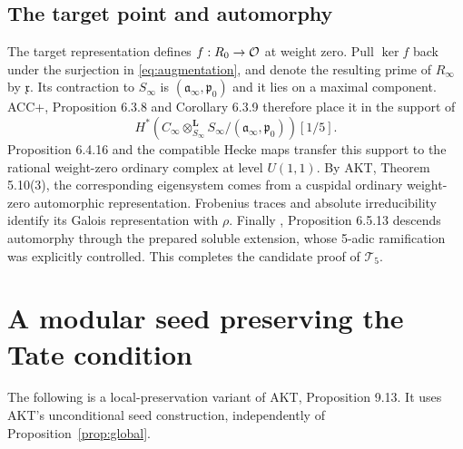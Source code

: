 \documentclass[11pt,a4paper]{article}
\theoremstyle{definition}\newtheorem{definition}[theorem]{Definition}
\theoremstyle{remark}\newtheorem*{remark}{Remark}
\newcommand{\Tinput}{\mathcal T_5}
\begin{document}
\subsection{The target point and automorphy}

The target representation defines $f:R_0\to\mathcal O$ at weight zero. Pull
$\ker f$ back under the surjection in \eqref{eq:augmentation}, and denote
the resulting prime of $R_\infty$ by $\mathfrak x$. Its contraction to
$S_\infty$ is $(\mathfrak a_\infty,\mathfrak p_0)$ and it lies on a maximal
component. ACC+, Proposition 6.3.8 and Corollary 6.3.9 therefore place it in
the support of
\[
H^*\!\left(C_\infty\otimes^{\mathbf L}_{S_\infty}
S_\infty/(\mathfrak a_\infty,\mathfrak p_0)\right)[1/5].
\]
Proposition 6.4.16 and the compatible Hecke maps transfer this support to
the rational weight-zero ordinary complex at level $U(1,1)$. By AKT,
Theorem 5.10(3), the corresponding eigensystem comes from a cuspidal ordinary
weight-zero automorphic representation. Frobenius traces and absolute
irreducibility identify its Galois representation with $\rho$.
Finally \cite{ACC}, Proposition 6.5.13 descends automorphy through the
prepared soluble extension, whose 5-adic ramification was explicitly
controlled. This completes the candidate proof of $\Tinput$.

\section{A modular seed preserving the Tate condition}
\label{sec:seed}

The following is a local-preservation variant of AKT, Proposition 9.13.
It uses AKT's unconditional seed construction, independently of
Proposition~\ref{prop:global}.
\end{document}
